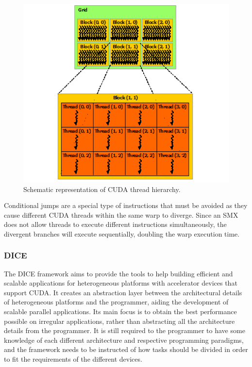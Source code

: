 \begin{figure}[!htp]
	\begin{center}
		\includegraphics[scale=0.9]{imgs/cuda_threads.png}
		\caption{Schematic representation of CUDA thread hierarchy.}
		\label{fig:cuda}
	\end{center}
\end{figure}

Conditional jumps are a special type of instructions that must be avoided as they cause different CUDA threads within the same warp to diverge. Since an SMX does not allow threads to execute different instructions simultaneously, the divergent branches will execute sequentially, doubling the warp execution time.

\subsubsection*{DICE}

The DICE framework aims to provide the tools to help building efficient and scalable applications for heterogeneous platforms with accelerator devices that support CUDA. It creates an abstraction layer between the architectural details of heterogeneous platforms and the programmer, aiding the development of scalable parallel applications. Its main focus is to obtain the best performance possible on irregular applications, rather than abstracting all the architecture details from the programmer. It is still required to the programmer to have some knowledge of each different architecture and respective programming paradigms, and the framework needs to be instructed of how tasks should be divided in order to fit the requirements of the different devices. 

